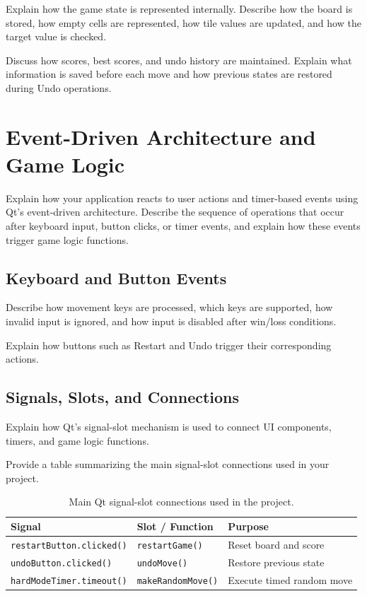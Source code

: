 \documentclass[a4paper,12pt]{article}
\begin{document}
Explain how the game state is represented internally. Describe how the board is stored, how empty cells are represented, how tile values are updated, and how the target value is checked.

Discuss how scores, best scores, and undo history are maintained. Explain what information is saved before each move and how previous states are restored during Undo operations.

\section{Event-Driven Architecture and Game Logic}

Explain how your application reacts to user actions and timer-based events using Qt's event-driven architecture. Describe the sequence of operations that occur after keyboard input, button clicks, or timer events, and explain how these events trigger game logic functions.

\subsection{Keyboard and Button Events}

Describe how movement keys are processed, which keys are supported, how invalid input is ignored, and how input is disabled after win/loss conditions.

Explain how buttons such as Restart and Undo trigger their corresponding actions.

\subsection{Signals, Slots, and Connections}

Explain how Qt's signal-slot mechanism is used to connect UI components, timers, and game logic functions.

Provide a table summarizing the main signal-slot connections used in your project.

\begin{table}[H]
\centering
\begin{tabular}{|l|l|l|}
\hline
\textbf{Signal} & \textbf{Slot / Function} & \textbf{Purpose} \\
\hline
\texttt{restartButton.clicked()} & \texttt{restartGame()} & Reset board and score \\
\hline
\texttt{undoButton.clicked()} & \texttt{undoMove()} & Restore previous state \\
\hline
\texttt{hardModeTimer.timeout()} & \texttt{makeRandomMove()} & Execute timed random move \\
\hline
\end{tabular}
\caption{Main Qt signal-slot connections used in the project.}
\end{table}
\end{document}
